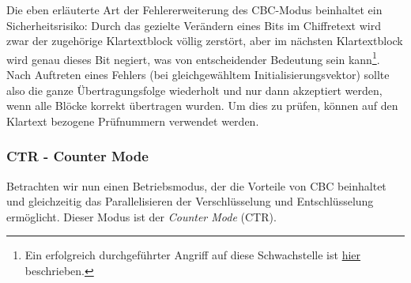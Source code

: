 Die eben erläuterte Art der Fehlererweiterung des CBC-Modus beinhaltet ein Sicherheitsrisiko: Durch das gezielte Verändern eines Bits im Chiffretext wird zwar
der zugehörige Klartextblock völlig zerstört, aber im nächsten Klartextblock wird genau dieses Bit negiert, was von entscheidender Bedeutung sein kann\footnote{Ein erfolgreich durchgeführter Angriff auf diese Schwachstelle ist  \href{http://www.heise.de/security/artikel/Erfolgreicher-Angriff-auf-Linux-Verschluesselung-2072199.html}{hier} beschrieben.}.
Nach Auftreten eines Fehlers (bei gleichgewähltem Initialisierungsvektor) sollte also die ganze Übertragungsfolge wiederholt und nur dann akzeptiert werden, wenn alle Blöcke korrekt übertragen wurden.
Um dies zu prüfen, können auf den Klartext bezogene Prüfnummern verwendet werden.

\subsubsection{CTR - Counter Mode}
Betrachten wir nun einen Betriebsmodus, der die Vorteile von CBC beinhaltet und gleichzeitig das Parallelisieren der Verschlüsselung und Entschlüsselung ermöglicht. Dieser Modus ist der \textit{Counter Mode} (CTR). 
